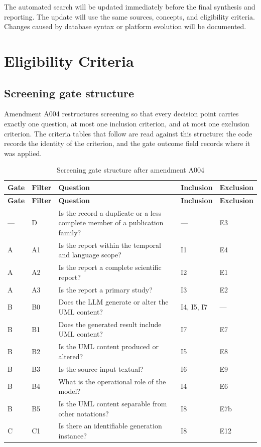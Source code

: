 The automated search will be updated immediately before the final synthesis and reporting. The update will use the same sources, concepts, and eligibility criteria. Changes caused by database syntax or platform evolution will be documented.

\section{Eligibility Criteria}
\label{sec:protocol_eligibility}

\subsection{Screening gate structure}
\label{sec:protocol_gates}

Amendment A004 restructures screening so that every decision point carries exactly one question, at most one inclusion criterion, and at most one exclusion criterion. The criteria tables that follow are read against this structure: the code records the identity of the criterion, and the gate outcome field records where it was applied.

\begin{longtable}{p{} p{} p{} p{} p{}}
\caption{Screening gate structure after amendment A004}
\label{tab:protocol_gates}\\
\toprule
\textbf{Gate} & \textbf{Filter} & \textbf{Question} & \textbf{Inclusion} & \textbf{Exclusion} \\
\midrule
\endfirsthead
\toprule
\textbf{Gate} & \textbf{Filter} & \textbf{Question} & \textbf{Inclusion} & \textbf{Exclusion} \\
\midrule
\endhead
--- & D & Is the record a duplicate or a less complete member of a publication family? & --- & E3 \\
A & A1 & Is the report within the temporal and language scope? & I1 & E4 \\
A & A2 & Is the report a complete scientific report? & I2 & E1 \\
A & A3 & Is the report a primary study? & I3 & E2 \\
B & B0 & Does the LLM generate or alter the UML content? & I4, I5, I7 & --- \\
B & B1 & Does the generated result include UML content? & I7 & E7 \\
B & B2 & Is the UML content produced or altered? & I5 & E8 \\
B & B3 & Is the source input textual? & I6 & E9 \\
B & B4 & What is the operational role of the model? & I4 & E6 \\
B & B5 & Is the UML content separable from other notations? & I8 & E7b \\
C & C1 & Is there an identifiable generation instance? & I8 & E12 \\
\bottomrule
\end{longtable}

